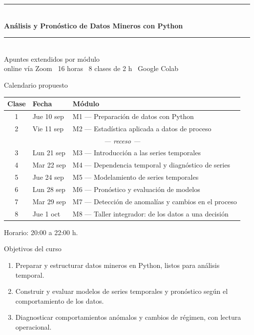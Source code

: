 


\subtitle[Presentación]{Presentación general del curso}

\begin{frame}[plain]
  \vfill
  {\color{azulmina}\rule{\linewidth}{2pt}}\\[0.6em]
  {\LARGE\bfseries\color{azulmina} Análisis y Pronóstico de Datos Mineros con Python}\\[0.6em]
  {\color{azulmina}\rule{\linewidth}{2pt}}\\[1.2em]
  \large Apuntes extendidos por módulo\\[0.4em]
  \normalsize online vía Zoom \textbullet\ 16 horas \textbullet\ 8 clases de 2 h \textbullet\ Google Colab
  \vfill
\end{frame}

\begin{frame}{Calendario propuesto}
\small
\begin{center}
\begin{tabular}{cll}
\toprule
Clase & Fecha & Módulo\\
\midrule
1 & Jue 10 sep & M1 — Preparación de datos con Python\\
2 & Vie 11 sep & M2 — Estadística aplicada a datos de proceso\\
\multicolumn{3}{c}{\textit{— receso —}}\\
3 & Lun 21 sep & M3 — Introducción a las series temporales\\
4 & Mar 22 sep & M4 — Dependencia temporal y diagnóstico de series\\
5 & Jue 24 sep & M5 — Modelamiento de series temporales\\
6 & Lun 28 sep & M6 — Pronóstico y evaluación de modelos\\
7 & Mar 29 sep & M7 — Detección de anomalías y cambios en el proceso\\
8 & Jue 1 oct & M8 — Taller integrador: de los datos a una decisión\\
\bottomrule
\end{tabular}
\end{center}
\vspace{0.4em}
Horario: 20:00 a 22:00 h.
\end{frame}

\begin{frame}{Objetivos del curso}
\begin{enumerate}
  \item Preparar y estructurar datos mineros en Python, listos para análisis temporal.
  \item Construir y evaluar modelos de series temporales y pronóstico según el
        comportamiento de los datos.
  \item Diagnosticar comportamientos anómalos y cambios de régimen, con lectura operacional.
\end{enumerate}
\end{frame}


